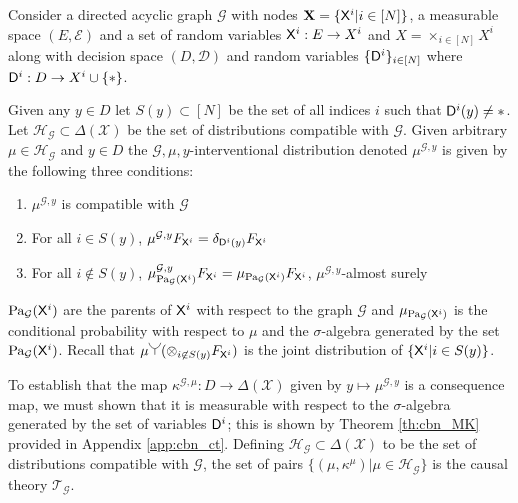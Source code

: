 \begin{definition}\label{def:CBN}
Consider a directed acyclic graph $\mathcal{G}$ with nodes $\mathbf{X}=\{\mathsf{X}^i|i\in [N]\}$, a measurable space $(E,\mathcal{E})$ and a set of random variables $\mathsf{X}^i:E\to X^i$ and $X=\times_{i\in[N]} X^i$ along with decision space $(D,\mathcal{D})$ and random variables $\{\mathsf{D}^i\}_{i\in [N]}$ where $\mathsf{D}^i:D\to X^i\cup\{*\}$.

Given any $y\in D$ let $S(y)\subset[N]$ be the set of all indices $i$ such that $\mathsf{D}^i(y)\neq *$. Let $\mathscr{H}_\mathcal{G}\subset\Delta(\mathcal{X})$ be the set of distributions compatible with $\mathcal{G}$. Given arbitrary $\mu\in \mathscr{H}_\mathcal{G}$ and $y\in D$ the $\mathcal{G},\mu,y$-interventional distribution denoted $\mu^{\mathcal{G},y}$ is given by the following three conditions:
\begin{enumerate}
    \item $\mu^{\mathcal{G},y}$ is compatible with $\mathcal{G}$
    \item For all $i\in S(y)$, $\mu^{\mathcal{G},y}F_{\mathsf{X}^i}=\delta_{\mathsf{D}^i(y)} F_{\mathsf{X}^i}$
    \item For all $i\not \in S(y)$, $\mu^{\mathcal{G},y}_{\text{Pa}_{\mathcal{G}}(\mathsf{X}^i)} F_{\mathsf{X}^i}=\mu_{\text{Pa}_{\mathcal{G}}(\mathsf{X}^i)}F_{\mathsf{X}^i} $, $\mu^{\mathcal{G},y}$-almost surely
\end{enumerate}
\end{definition}

$\text{Pa}_{\mathcal{G}}(\mathsf{X}^i)$ are the parents of $\mathsf{X}^i$ with respect to the graph $\mathcal{G}$ and $\mu_{\text{Pa}_{\mathcal{G}}(\mathsf{X}^i)}$ is the conditional probability with respect to $\mu$ and the $\sigma$-algebra generated by the set $\text{Pa}_{\mathcal{G}}(\mathsf{X}^i)$. Recall that $\mu \splitter{0.15}(\otimes_{i\not\in S(y)} F_{\RV{X}^i})$ is the joint distribution of $\{\mathsf{X}^i|i\in S(y)\}$.

To establish that the map $\kappa^{\mathcal{G},\mu}:D\to \Delta(\mathcal{X})$ given by $y\mapsto \mu^{\mathcal{G},y}$ is a consequence map, we must shown that it is measurable with respect to the $\sigma$-algebra generated by the set of variables $\mathsf{D}^i$; this is shown by Theorem \ref{th:cbn_MK} provided in Appendix \ref{app:cbn_ct}. Defining $\mathscr{H}_{\mathcal{G}}\subset\Delta(\mathcal{X})$ to be the set of distributions compatible with $\mathcal{G}$, the set of pairs $\{(\mu, \kappa^\mu)|\mu\in \mathscr{H}_{\mathcal{G}}\}$ is the causal theory $\mathscr{T}_\mathcal{G}$.

